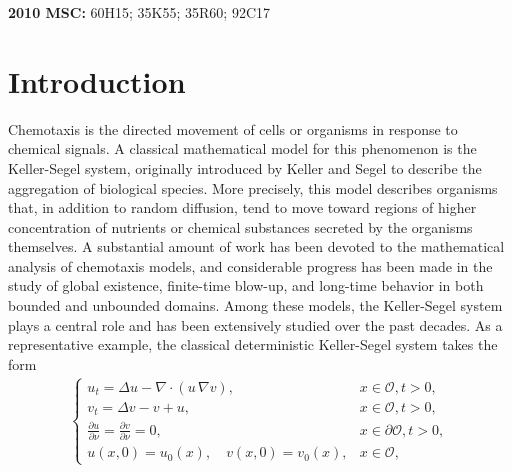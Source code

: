 \documentclass[reqno, 11pt]{amsart}
\theoremstyle{definition}
\numberwithin{equation}{section} \numberwithin{lem}{section}
\numberwithin{thm}{section} \numberwithin{prop}{section}
\numberwithin{cor}{section} \numberwithin{rem}{section}
\numberwithin{defn}{section}
\begin{document}
{\small {\bf 2010 MSC:} 60H15; 35K55; 35R60; 92C17}



\section{Introduction}
 Chemotaxis is the directed movement of cells or organisms in response to chemical signals. A classical mathematical model for  this phenomenon is the Keller-Segel system,  originally introduced by Keller and Segel \cite{keller1970initiation, keller1971model} to describe the aggregation of biological species.  More precisely, this model describes organisms that, in addition to random diffusion, tend to move toward regions of higher concentration of nutrients or chemical substances secreted by the organisms themselves. 
A substantial amount of work has been devoted to the mathematical analysis of chemotaxis models, and considerable progress has been made in the study of global existence, finite-time blow-up, and long-time behavior in both bounded and unbounded domains. Among these models, the Keller-Segel system plays a central role and has been extensively studied over the past decades. As a representative example, the classical deterministic Keller-Segel system takes the form
\begin{eqnarray}\label{classical_K_S}
\begin{cases}	
	u_t  = \Delta u-  \nabla  \cdot (u\, \nabla v),&x\in\mathcal{O},t> 0,
    \\v_t=\Delta v-v+u,&x\in\mathcal{O},t> 0,\\\frac{\partial u}{\partial \nu} =\frac{\partial v}{\partial \nu} = 0,&x\in\partial\mathcal{O},t> 0,
    \\u (x,0) = u_{0}(x),\quad v (x,0) = v_{0}(x),&x\in\mathcal{O},
 \end{cases} 
\end{eqnarray}
\end{document}
